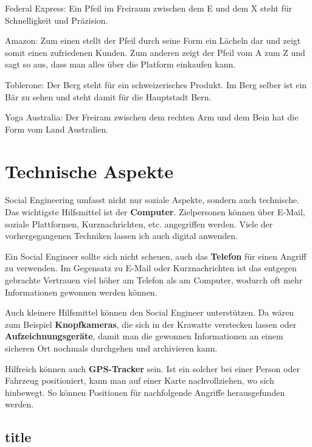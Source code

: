 
Federal Express: Ein Pfeil im Freiraum zwischen dem E und dem X steht für Schnelligkeit und Präzision.

Amazon: Zum einen stellt der Pfeil durch seine Form ein Lächeln dar und zeigt somit einen zufriedenen Kunden. Zum anderen zeigt der Pfeil vom A zum Z und sagt so aus, dass man alles über die Platform einkaufen kann.

Toblerone: Der Berg steht für ein schweizerisches Produkt. Im Berg selber ist ein Bär zu sehen und steht damit für die Hauptstadt Bern.

Yoga Australia: Der Freiram zwischen dem rechten Arm und dem Bein hat die Form vom Land Australien.

\section{Technische Aspekte}
Social Engineering umfasst nicht nur soziale Aspekte, sondern auch technische. Das wichtigste Hilfsmittel ist der \textbf{Computer}. Zielpersonen können über E-Mail, soziale Plattformen, Kurznachrichten, etc. angegriffen werden. Viele der vorhergegangenen Techniken lassen ich auch digital anwenden. 

Ein Social Engineer sollte sich nicht scheuen, auch das \textbf{Telefon} für einen Angriff zu verwenden. Im Gegensatz zu E-Mail oder Kurznachrichten ist das entgegen gebrachte Vertrauen viel höher am Telefon als am Computer, wodurch oft mehr Informationen gewonnen werden können.

Auch kleinere Hilfsmittel können den Social Engineer unterstützen. Da wären zum Beispiel \textbf{Knopfkameras}, die sich in der Krawatte verstecken lassen oder \textbf{Aufzeichnungsgeräte}, damit man die gewonnen Informationen an einem sicheren Ort nochmals durchgehen und archivieren kann.

Hilfreich können auch \textbf{GPS-Tracker} sein. Ist ein solcher bei einer Person oder Fahrzeug positioniert, kann man auf einer Karte nachvollziehen, wo sich hinbewegt. So können Positionen für nachfolgende Angriffe herausgefunden werden.

\subsection{title}